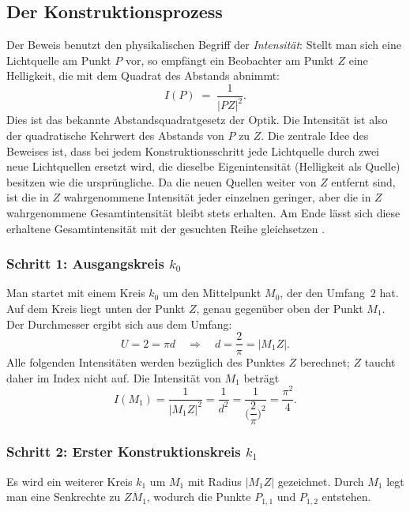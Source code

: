 \subsection{Der Konstruktionsprozess}
\label{basel:subsection:konstruktionsprozess}

{\sloppy
Der Beweis benutzt den physikalischen Begriff der \emph{Intensität}:
%
Stellt man sich eine Lichtquelle am Punkt $P$ vor, so empfängt
ein Beobachter am Punkt $Z$ eine Helligkeit, die mit dem
Quadrat des Abstands abnimmt:
\[
I(P) \;=\; \frac{1}{|PZ|^2}.
\]
Dies ist das bekannte Abstandsquadratgesetz der Optik.
Die Intensität ist also der quadratische Kehrwert des Abstands von $P$ zu $Z$.
Die zentrale Idee des Beweises ist, dass bei jedem Konstruktionsschritt
jede Lichtquelle durch zwei neue Lichtquellen ersetzt wird, die dieselbe
Eigenintensität (Helligkeit als Quelle) besitzen wie die ursprüngliche.
Da die neuen Quellen weiter von $Z$ entfernt sind, ist die in $Z$
wahrgenommene Intensität jeder einzelnen geringer, aber die in $Z$
wahrgenommene Gesamtintensität bleibt stets erhalten.
Am Ende lässt sich diese erhaltene Gesamtintensität mit der gesuchten Reihe
gleichsetzen \cite{basel:Wikipedia}.
}

\subsubsection{Schritt 1: Ausgangskreis $k_0$}
Man startet mit einem Kreis $k_0$ um den Mittelpunkt $M_0$, der den Umfang~$2$ hat.
Auf dem Kreis liegt unten der Punkt $Z$, genau gegenüber oben der Punkt $M_1$.
Der Durchmesser ergibt sich aus dem Umfang:
\[
U = 2 = \pi d
\quad\Rightarrow\quad
d = \frac{2}{\pi} = |M_1 Z|.
\]
Alle folgenden Intensitäten werden bezüglich des Punktes $Z$ berechnet;
$Z$ taucht daher im Index nicht auf.
Die Intensität von $M_1$ beträgt
\[
I(M_1)
=
\frac{1}{|M_1 Z|^2}
=
\frac{1}{d^2}
=
\frac{1}{\biggl(\dfrac{2}{\pi}\biggr)^2}
=
\frac{\pi^2}{4}.
\]



\subsubsection{Schritt 2: Erster Konstruktionskreis $k_1$}
Es wird ein weiterer Kreis $k_1$ um $M_1$ mit Radius $|M_1 Z|$ gezeichnet.
Durch $M_1$ legt man eine Senkrechte zu $\overline{ZM_1}$, wodurch die
Punkte $P_{1,1}$ und $P_{1,2}$ entstehen.



